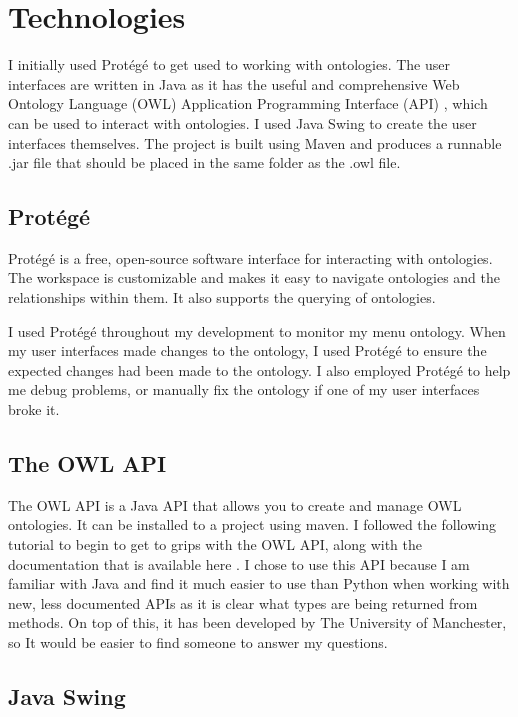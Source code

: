 \section{Technologies}

I initially used Protégé to get used to working with ontologies. The user interfaces are written in Java as it has the useful and comprehensive Web Ontology Language (OWL) Application Programming Interface (API) \cite{owl_api}, which can be used to interact with ontologies. I used Java Swing to create the user interfaces themselves. The project is built using Maven and produces a runnable .jar file that should be placed in the same folder as the .owl file.

\subsection{Protégé}

Protégé \cite{protege_2023} is a free, open-source software interface for interacting with ontologies. The workspace is customizable and makes it easy to navigate ontologies and the relationships within them. It also supports the querying of ontologies.

I used Protégé throughout my development to monitor my menu ontology. When my user interfaces made changes to the ontology, I used Protégé to ensure the expected changes had been made to the ontology. I also employed Protégé to help me debug problems, or manually fix the ontology if one of my user interfaces broke it.

\subsection{The OWL API}

The OWL API is a Java API that allows you to create and manage OWL ontologies. It can be installed to a project using maven. I followed the following tutorial \cite{matenzoglu_palmisano_2016} to begin to get to grips with the OWL API, along with the documentation that is available here \cite{owl_api_doc_2023}. I chose to use this API because I am familiar with Java and find it much easier to use than Python when working with new, less documented APIs as it is clear what types are being returned from methods. On top of this, it has been developed by The University of Manchester, so It would be easier to find someone to answer my questions.

\subsection{Java Swing}


